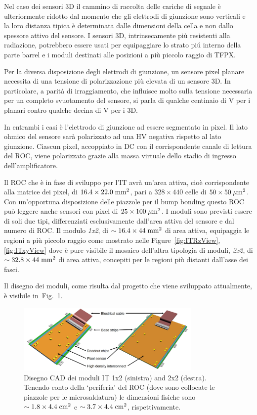 Nel caso dei sensori 3D il cammino di raccolta delle cariche di segnale \`e ulteriormente ridotto dal momento che gli elettrodi di giunzione sono verticali e la loro distanza tipica \`e determinata dalle dimensioni della cella e non dallo spessore attivo del sensore. I sensori 3D, intrinsecamente pi\`u resistenti alla radiazione, potrebbero essere usati per equipaggiare lo strato pi\'u interno della parte barrel e i moduli destinati alle posizioni a pi\`u piccolo raggio di TFPX.

Per la diversa disposizione degli elettrodi di giunzione, un sensore pixel planare necessita di una tensione di polarizzazione pi\`u elevata di un sensore 3D. In particolare, a parit\`a di irraggiamento, che influisce molto sulla tensione necessaria per un completo svuotamento del sensore, si parla di qualche centinaio di V per i planari contro qualche decina di V per i 3D.

In entrambi i casi \`e l'elettrodo di giunzione ad essere segmentato in pixel. Il lato ohmico del sensore sar\`a polarizzato ad una HV negativa rispetto al lato giunzione. Ciascun pixel, accoppiato in DC con il corrispondente canale di lettura del ROC, viene polarizzato grazie alla massa virtuale dello stadio di ingresso dell'amplificatore.
%
%

Il ROC che \`e in fase di sviluppo per l'IT avr\`a un'area attiva, cio\`e corrispondente alla matrice dei pixel, di $16.4\times22.0\rm \; mm^2$, pari a $328\times440$ celle di $50\times50\; \mu \rm m^2$. Con un'opportuna disposizione delle piazzole per il bump bonding questo ROC pu\`o leggere anche sensori con pixel di $25\times100\; \mu \rm m^2$. 
I moduli sono previsti essere di soli due tipi, differenziati esclusivamente dall'area attiva del sensore e dal numero di ROC. Il modulo {\em 1x2}, di $\sim16.4\times44\rm \; mm^2$ di area attiva, equipaggia le regioni a pi\`u piccolo raggio come mostrato nelle Figure~\ref{fig:ITRzView},\ref{fig:ITxyView} dove \`e pure visibile il mosaico dell'altra tipologia di moduli, {\em 2x2}, di $\sim32.8\times44\rm \; mm^2$ di area attiva, concepiti per le regioni pi\`u distanti dall'asse dei fasci.

Il disegno dei moduli, come risulta dal progetto che viene sviluppato attualmente, \`e visibile in~Fig.~\ref{fig:ITModSkecth}.
\begin{figure}
\centering
\includegraphics[width=0.8\textwidth]{Immagini/ITModSkecth.PNG}
\caption{Disegno CAD dei moduli IT 1x2 (sinistra) and 2x2 (destra). Tenendo conto della `periferia' del ROC (dove sono collocate le piazzole per le microsaldatura) le dimensioni fisiche sono  $\sim1.8\times4.4\rm \; cm^2$ e  $\sim3.7\times4.4\rm \; cm^2$, rispettivamente.}  
\label{fig:ITModSkecth}
\end{figure}


